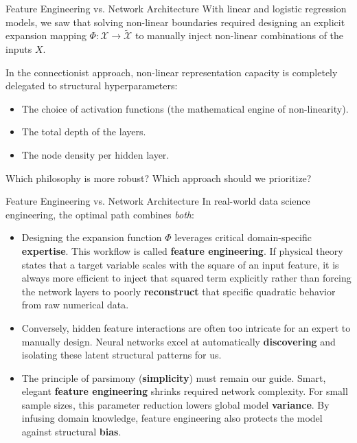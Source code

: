 \begin{frame}{Feature Engineering vs. Network Architecture}
	With linear and logistic regression models, we saw that solving non-linear boundaries required designing an explicit expansion mapping $\Phi: \mathcal{X} \to \tilde{\mathcal{X}}$ to manually inject non-linear combinations of the inputs $X$.
	
	\vspace{0.5cm}
	\pause
	
	In the connectionist approach, non-linear representation capacity is completely delegated to structural hyperparameters:
	\begin{itemize}
		\item The choice of activation functions (the mathematical engine of non-linearity).
		\item The total depth of the layers.
		\item The node density per hidden layer.
	\end{itemize}
	
	\vspace{0.5cm}
	\pause
	
	Which philosophy is more robust? Which approach should we prioritize?
\end{frame}

\begin{frame}{Feature Engineering vs. Network Architecture}
	In real-world data science engineering, the optimal path combines \textit{both}:
	
	\begin{itemize}
		\item Designing the expansion function $\Phi$ leverages critical domain-specific \textbf{expertise}. This workflow is called \textbf{feature engineering}. If physical theory states that a target variable scales with the square of an input feature, it is always more efficient to inject that squared term explicitly rather than forcing the network layers to poorly \textbf{reconstruct} that specific quadratic behavior from raw numerical data.
		\pause
		\item Conversely, hidden feature interactions are often too intricate for an expert to manually design. Neural networks excel at automatically \textbf{discovering} and isolating these latent structural patterns for us.
		\pause
		\item The principle of parsimony (\textbf{simplicity}) must remain our guide. Smart, elegant \textbf{feature engineering} shrinks required network complexity. For small sample sizes, this parameter reduction lowers global model \textbf{variance}. By infusing domain knowledge, feature engineering also protects the model against structural \textbf{bias}.
	\end{itemize}	
\end{frame}

